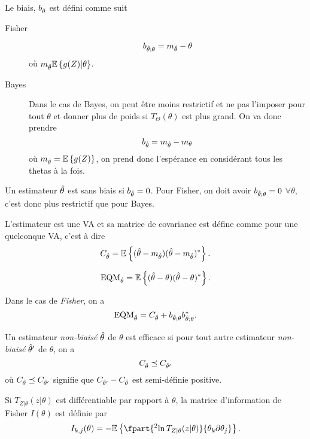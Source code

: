 \begin{mydef}
  Le biais, $b_{\hat{\theta}}$ est défini comme suit
  \begin{description}
    \item[Fisher]
      \[ b_{\hat{\theta};\theta} = m_{\hat{\theta}} - \theta \]
      où
      $m_{\hat{\theta}} \mathbb{E}\left\{g(Z)|\theta\right\}$.
    \item[Bayes] Dans le cas de Bayes, on peut être moins restrictif et
      ne pas l'imposer pour tout $\theta$ et donner plus de poids
      si $T_\Theta(\theta)$ est plus grand.
      On va donc prendre
      \[ b_{\hat{\theta}} = m_{\hat{\theta}} - m_\theta \]
      où $m_{\hat{\theta}} = \mathbb{E}\left\{g(Z)\right\}$, on prend donc l'espérance en considérant
      tous les thetas à la fois.
  \end{description}
  Un estimateur $\hat{\theta}$ est sans biais si $b_{\hat{\theta}} = 0$.
  Pour Fisher, on doit avoir $b_{\hat{\theta};\theta} = 0$ $\forall \theta$,
  c'est donc plus restrictif que pour Bayes.
\end{mydef}

\begin{mydef}
  L'estimateur est une VA et sa matrice de covariance est défine comme pour une quelconque VA,
  c'est à dire
  \[ C_{\hat{\theta}} = \mathbb{E}\left\{(\hat{\theta} - m_{\hat{\theta}})(\hat{\theta} - m_{\hat{\theta}})^*\right\}. \]
\end{mydef}

\begin{mydef}
  \[ \mathrm{EQM}_{\hat{\theta}} = \mathbb{E}\left\{(\hat{\theta} - \theta)(\hat{\theta}-\theta)^*\right\}. \]
\end{mydef}

Dans le cas de \emph{Fisher}, on a
\begin{equation}
  \label{eq:fisheqm}
  \mathrm{EQM}_{\hat{\theta}} = C_{\hat{\theta}} + b_{\hat{\theta};\theta}b_{\hat{\theta};\theta}^*.
\end{equation}

\begin{mydef}
  Un estimateur \emph{non-biaisé} $\hat{\theta}$ de $\theta$ est efficace si
  pour tout autre estimateur \emph{non-biaisé} $\hat{\theta}'$ de $\theta$, on a
  \[ C_{\hat{\theta}} \preceq C_{\hat{\theta}'} \]
  où $C_{\hat{\theta}} \preceq C_{\hat{\theta}'}$ signifie que $C_{\hat{\theta}'} - C_{\hat{\theta}}$
  est semi-définie positive.
\end{mydef}

\begin{mydef}
  Si $T_{Z|\theta}(z|\theta)$ est différentiable par rapport à $\theta$,
  la matrice d'information de Fisher $I(\theta)$ est définie par
  \[ I_{k,j}(\theta) = -\Ex{\fpart{^2\ln T_{Z|\theta}(z|\theta)}{\theta_k\partial\theta_j}}. \]
\end{mydef}

